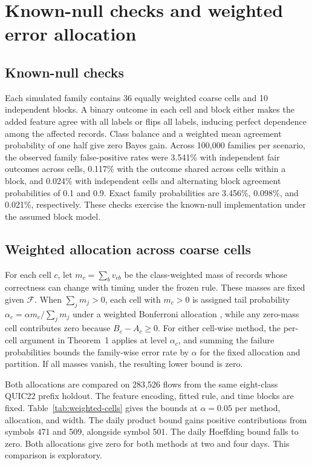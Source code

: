\documentclass[preprint,11pt]{elsarticle}
\newcommand{\given}{\mathcal F}
\begin{document}
\FloatBarrier

\section{Known-null checks and weighted error allocation}

\subsection{Known-null checks}

Each simulated family contains 36 equally weighted coarse cells and 10 independent blocks. A binary outcome in each cell and block either makes the added feature agree with all labels or flips all labels, inducing perfect dependence among the affected records. Class balance and a weighted mean agreement probability of one half give zero Bayes gain. Across 100,000 families per scenario, the observed family false-positive rates were 3.541\% with independent fair outcomes across cells, 0.117\% with the outcome shared across cells within a block, and 0.024\% with independent cells and alternating block agreement probabilities of 0.1 and 0.9. Exact family probabilities are 3.456\%, 0.098\%, and 0.021\%, respectively. These checks exercise the known-null implementation under the assumed block model.

\subsection{Weighted allocation across coarse cells}
\label{app:weighted-cells}

For each cell $c$, let $m_c=\sum_b v_{cb}$ be the class-weighted mass of records whose correctness can change with timing under the frozen rule. These masses are fixed given $\given$. When $\sum_j m_j>0$, each cell with $m_c>0$ is assigned tail probability $\alpha_c=\alpha m_c/\sum_j m_j$ under a weighted Bonferroni allocation \cite{roeder2009weighted}, while any zero-mass cell contributes zero because $B_c-A_c\ge0$. For either cell-wise method, the per-cell argument in Theorem~1 applies at level $\alpha_c$, and summing the failure probabilities bounds the family-wise error rate by $\alpha$ for the fixed allocation and partition. If all masses vanish, the resulting lower bound is zero.

Both allocations are compared on 283{,}526 flows from the same eight-class QUIC22 prefix holdout. The feature encoding, fitted rule, and time blocks are fixed. Table~\ref{tab:weighted-cells} gives the bounds at $\alpha=0.05$ per method, allocation, and width. The daily product bound gains positive contributions from symbols 471 and 509, alongside symbol 501. The daily Hoeffding bound falls to zero. Both allocations give zero for both methods at two and four days. This comparison is exploratory.
\end{document}
